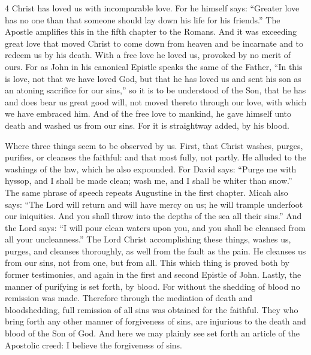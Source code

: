 4 Christ has loved us with incomparable love. For he himself says: “Greater love has no one than that someone should lay down his life for his friends.” The Apostle amplifies this in the fifth chapter to the Romans. And it was exceeding great love that moved Christ to come down from heaven and be incarnate and to redeem us by his death. With a free love he loved us, provoked by no merit of ours. For as John in his canonical Epistle speaks the same of the Father, “In this is love, not that we have loved God, but that he has loved us and sent his son as an atoning sacrifice for our sins,” so it is to be understood of the Son, that he has and does bear us great good will, not moved thereto through our love, with which we have embraced him. And of the free love to mankind, he gave himself unto death and washed us from our sins. For it is straightway added, by his blood.

Where three things seem to be observed by us. First, that Christ washes, purges, purifies, or cleanses the faithful: and that most fully, not partly. He alluded to the washings of the law, which he also expounded. For David says: “Purge me with hyssop, and I shall be made clean; wash me, and I shall be whiter than snow.” The same phrase of speech repeats Augustine in the first chapter. Micah also says: “The Lord will return and will have mercy on us; he will trample underfoot our iniquities. And you shall throw into the depths of the sea all their sins.” And the Lord says: “I will pour clean waters upon you, and you shall be cleansed from all your uncleanness.” The Lord Christ accomplishing these things, washes us, purges, and cleanses thoroughly, as well from the fault as the pain. He cleanses us from our sins, not from one, but from all. This which thing is proved both by former testimonies, and again in the first and second Epistle of John. Lastly, the manner of purifying is set forth, by blood. For without the shedding of blood no remission was made. Therefore through the mediation of death and bloodshedding, full remission of all sins was obtained for the faithful. They who bring forth any other manner of forgiveness of sins, are injurious to the death and blood of the Son of God. And here we may plainly see set forth an article of the Apostolic creed: I believe the forgiveness of sins.

